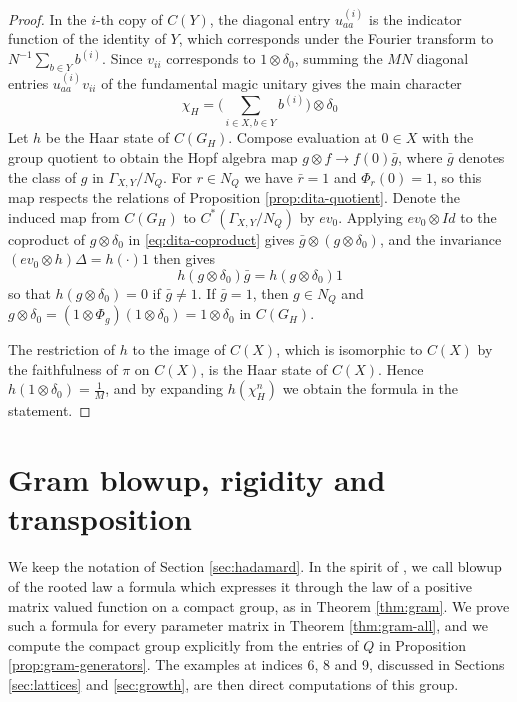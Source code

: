 \documentclass[11pt,reqno]{amsart}
\theoremstyle{definition}
\numberwithin{equation}{section}
\begin{document}
\begin{proof}
In the $i$-th copy of $C(Y)$, the diagonal entry $u^{(i)}_{aa}$ is the indicator function of the identity of $Y$, which corresponds under the Fourier transform to $N^{-1}\sum_{b\in Y}b^{(i)}$. Since $v_{ii}$ corresponds to $1\otimes\delta_0$, summing the $MN$ diagonal entries $u^{(i)}_{aa}v_{ii}$ of the fundamental magic unitary gives the main character
$$\chi_H=\Big(\sum_{i\in X,b\in Y}b^{(i)}\Big)\otimes\delta_0$$
Let $h$ be the Haar state of $C(G_H)$. Compose evaluation at $0\in X$ with the group quotient to obtain the Hopf algebra map $g\otimes f\to f(0)\bar g$, where $\bar g$ denotes the class of $g$ in $\Gamma_{X,Y}/N_Q$. For $r\in N_Q$ we have $\bar r=1$ and $\Phi_r(0)=1$, so this map respects the relations of Proposition \ref{prop:dita-quotient}. Denote the induced map from $C(G_H)$ to $C^*(\Gamma_{X,Y}/N_Q)$ by $ev_0$. Applying $ev_0\otimes Id$ to the coproduct of $g\otimes\delta_0$ in \eqref{eq:dita-coproduct} gives $\bar g\otimes(g\otimes\delta_0)$, and the invariance $(ev_0\otimes h)\Delta=h(\cdot)1$ then gives
$$h(g\otimes\delta_0)\bar g=h(g\otimes\delta_0)1$$
so that $h(g\otimes\delta_0)=0$ if $\bar g\neq1$. If $\bar g=1$, then $g\in N_Q$ and $g\otimes\delta_0=(1\otimes\Phi_g)(1\otimes\delta_0)=1\otimes\delta_0$ in $C(G_H)$.

The restriction of $h$ to the image of $C(X)$, which is isomorphic to $C(X)$ by the faithfulness of $\pi$ on $C(X)$, is the Haar state of $C(X)$. Hence $h(1\otimes\delta_0)=\frac1M$, and by expanding $h(\chi_H^n)$ we obtain the formula in the statement.
\end{proof}

\section{Gram blowup, rigidity and transposition}\label{sec:fourier-blowups}

We keep the notation of Section \ref{sec:hadamard}. In the spirit of \cite{BBi15}, we call blowup of the rooted law a formula which expresses it through the law of a positive matrix valued function on a compact group, as in Theorem \ref{thm:gram}. We prove such a formula for every parameter matrix in Theorem \ref{thm:gram-all}, and we compute the compact group explicitly from the entries of $Q$ in Proposition \ref{prop:gram-generators}. The examples at indices 6, 8 and 9, discussed in Sections \ref{sec:lattices} and \ref{sec:growth}, are then direct computations of this group.
\end{document}
